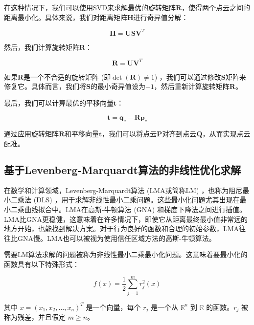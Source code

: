 在这种情况下，我们可以使用SVD来求解最优的旋转矩阵$\boldsymbol{R}$，使得两个点云之间的距离最小化。具体来说，我们对距离矩阵$\boldsymbol{H}$进行奇异值分解：

\begin{equation}
\boldsymbol{H} = \boldsymbol{U} \boldsymbol{S} \boldsymbol{V}^T
\end{equation}

然后，我们计算旋转矩阵$\boldsymbol{R}$：

\begin{equation}
\boldsymbol{R} = \boldsymbol{U} \boldsymbol{V}^T
\end{equation}

如果$\boldsymbol{R}$是一个不合适的旋转矩阵 (即$\det(\boldsymbol{R})\neq 1$) ，我们可以通过修改$\boldsymbol{S}$矩阵来修复它。具体而言，我们将$\boldsymbol{S}$的最小奇异值设为$-1$，然后重新计算旋转矩阵$\boldsymbol{R}$。

最后，我们可以计算最优的平移向量$\boldsymbol{t}$：

\begin{equation}
\boldsymbol{t} = \boldsymbol{q}_c - \boldsymbol{R} \boldsymbol{p}_c
\end{equation}

通过应用旋转矩阵$\boldsymbol{R}$和平移向量$\boldsymbol{t}$，我们可以将点云$\boldsymbol{P}$对齐到点云$\boldsymbol{Q}$，从而实现点云配准。

\subsection{基于Levenberg-Marquardt算法的非线性优化求解}
在数学和计算领域，Levenberg-Marquardt算法 (LMA或简称LM) \cite{levenberg1944method} ，也称为阻尼最小二乘法 (DLS) ，用于求解非线性最小二乘问题。这些最小化问题尤其出现在最小二乘曲线拟合中。LMA在高斯-牛顿算法 (GNA) 和梯度下降法之间进行插值。LMA比GNA更稳健，这意味着在许多情况下，即使它从距离最终最小值非常远的地方开始，也能找到解决方案。对于行为良好的函数和合理的初始参数，LMA往往比GNA慢。LMA也可以被视为使用信任区域方法的高斯-牛顿算法。

需要LM算法求解的问题被称为非线性最小二乘最小化问题。这意味着要最小化的函数具有以下特殊形式：

\begin{equation}
f(x) = \frac{1}{2} \sum_{j=1}^{m} r_j^2(x)
\end{equation}

其中 $x = (x_1, x_2, \dots, x_n)^T$ 是一个向量，每个 $r_j$ 是一个从 $\mathbb{R}^n$ 到 $\mathbb{R}$ 的函数。$r_j$ 被称为残差，并且假定 $m \geq n$。

